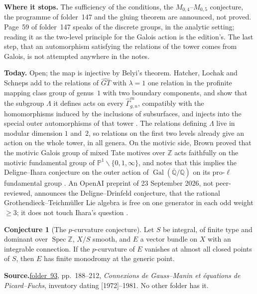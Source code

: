 \documentclass[11pt]{article}
\newcommand{\fac}[1]{\href{https://grothendieck.umontpellier.fr/#1.pdf}{folder~#1}}
\newcommand{\Spec}{\operatorname{Spec}}
\newcommand{\Gal}{\operatorname{Gal}}
\theoremstyle{definition}
\theoremstyle{plain}\newtheorem*{proposition}{Proposition}\theoremstyle{definition}
\newtheorem{bigconj}{Conjecture}
\newcommand{\entry}[1]{\par\medskip\noindent\textbf{#1}\enspace}
\newcommand{\src}[1]{\entry{Source.}#1}
\begin{document}
\entry{Where it stops.} The sufficiency of the conditions, the $M_{0,4}$--$M_{0,5}$ conjecture, the programme of folder~147 and the gluing theorem are announced, not proved. Page~59 of folder~147 speaks of the discrete groups, in the analytic setting; reading it as the two-level principle for the Galois action is the edition's. The last step, that an automorphism satisfying the relations of the tower comes from Galois, is not attempted anywhere in the notes.

\entry{Today.} Open; the map is injective by Belyi's theorem. Hatcher, Lochak and Schneps add to the relations of $\widehat{GT}$ with $\lambda = 1$ one relation in the profinite mapping class group of genus~$1$ with two boundary components, and show that the subgroup $\Lambda$ it defines acts on every $\widehat\Gamma^m_{g,n}$, compatibly with the homomorphisms induced by the inclusions of subsurfaces, and injects into the special outer automorphisms of that tower \cite[Th.~A--C]{hls}. The relations defining $\Lambda$ live in modular dimension $1$ and~$2$, so relations on the first two levels already give an action on the whole tower, in all genera. On the motivic side, Brown proved that the motivic Galois group of mixed Tate motives over $\mathbb Z$ acts faithfully on the motivic fundamental group of $\mathbb P^1 \smallsetminus \{0,1,\infty\}$, and notes that this implies the Deligne--Ihara conjecture on the outer action of $\Gal(\overline{\mathbb Q}/\mathbb Q)$ on its pro-$\ell$ fundamental group \cite[\S1, Conj.~1, Th.~1.1]{brownmtm}. An OpenAI preprint of 23 September 2026, not peer-reviewed, announces the Deligne--Drinfeld conjecture, that the rational Grothendieck--Teichmüller Lie algebra is free on one generator in each odd weight $\ge 3$; it does not touch Ihara's question \cite{openaimath}.

\begin{bigconj}[The $p$-curvature conjecture]\label{c:pcurv}
Let $S$ be integral, of finite type and dominant over $\Spec \mathbb Z$, $X/S$ smooth, and $E$ a vector bundle on $X$ with an integrable connection. If the $p$-curvature of $E$ vanishes at almost all closed points of $S$, then $E$ has finite monodromy at the generic point.
\end{bigconj}

\src{\fac{93}, pp.~188--212, \emph{Connexions de Gauss--Manin et équations de Picard--Fuchs}, inventory dating [1972]--1981. No other folder has it.}
\end{document}
